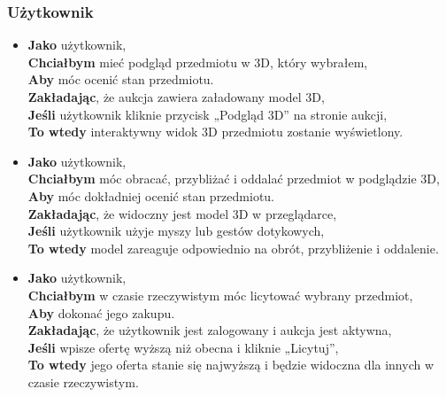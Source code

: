 \subsubsection{Użytkownik}
\begin{itemize}
    \item \textbf{Jako} użytkownik,\\
          \textbf{Chciałbym} mieć podgląd przedmiotu w 3D, który wybrałem,\\
          \textbf{Aby} móc ocenić stan przedmiotu.\\
          \textbf{Zakładając}, że aukcja zawiera załadowany model 3D, \\
          \textbf{Jeśli} użytkownik kliknie przycisk „Podgląd 3D” na stronie aukcji, \\
          \textbf{To wtedy} interaktywny widok 3D przedmiotu zostanie wyświetlony.\\

    \item \textbf{Jako} użytkownik,\\
          \textbf{Chciałbym} móc obracać, przybliżać i oddalać przedmiot w podglądzie 3D,\\
          \textbf{Aby} móc dokładniej ocenić stan przedmiotu.\\
          \textbf{Zakładając}, że widoczny jest model 3D w przeglądarce,\\
          \textbf{Jeśli} użytkownik użyje myszy lub gestów dotykowych,\\
          \textbf{To wtedy} model zareaguje odpowiednio na obrót, przybliżenie i oddalenie.\\


    \item \textbf{Jako} użytkownik,\\
          \textbf{Chciałbym} w czasie rzeczywistym móc licytować wybrany przedmiot,\\
          \textbf{Aby} dokonać jego zakupu.\\
          \textbf{Zakładając}, że użytkownik jest zalogowany i aukcja jest aktywna,\\
          \textbf{Jeśli} wpisze ofertę wyższą niż obecna i kliknie „Licytuj”,\\
          \textbf{To wtedy} jego oferta stanie się najwyższą i będzie widoczna dla innych w czasie rzeczywistym.\\


\end{itemize}
